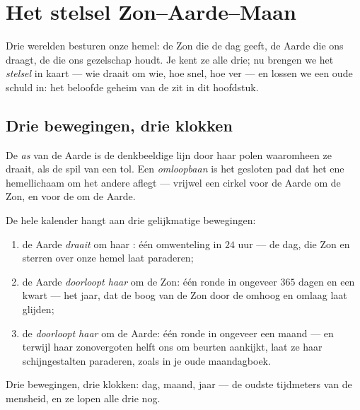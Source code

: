 \chapter{Het stelsel Zon--Aarde--Maan}\label{ch:g6:sun-earth-moon}

Drie werelden besturen onze hemel: de Zon die de dag geeft, de Aarde
die ons draagt, de  die ons gezelschap houdt. Je kent ze alle
drie; nu brengen we het \emph{stelsel} in kaart --- wie draait om wie,
hoe snel, hoe ver --- en lossen we een oude schuld in: het beloofde
geheim van de  zit in dit hoofdstuk.

\section{Drie bewegingen, drie klokken}

\begin{definition}[As en omloopbaan]\label{def:g6:sun-earth-moon:axisorbit}
De \emph{as} van de Aarde is de denkbeeldige lijn door haar
polen waaromheen ze draait, als de spil van een tol. Een
\emph{omloopbaan} is het gesloten pad dat het ene
hemellichaam om het andere aflegt --- vrijwel een cirkel voor de Aarde
om de Zon, en voor de  om de Aarde.
\end{definition}

\begin{proposition}\label{prop:g6:sun-earth-moon:motions}
De hele kalender hangt aan drie gelijkmatige bewegingen:
\begin{enumerate}
  \item de Aarde \emph{draait} om haar : één omwenteling in $24$
        uur --- de dag, die Zon en sterren over onze hemel laat
        paraderen;
  \item de Aarde \emph{doorloopt haar } om de Zon: één
        ronde in ongeveer $365$ dagen en een kwart --- het jaar, dat
        de boog van de Zon door de  omhoog en omlaag laat
        glijden;
  \item de  \emph{doorloopt haar } om de Aarde: één
        ronde in ongeveer een maand --- en terwijl haar zonovergoten
        helft ons om beurten aankijkt, laat ze haar schijngestalten
        paraderen, zoals in je oude maandagboek.
\end{enumerate}
Drie bewegingen, drie klokken: dag, maand, jaar --- de oudste
tijdmeters van de mensheid, en ze lopen alle drie nog.
\end{proposition}

